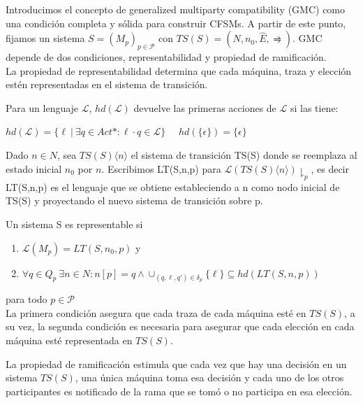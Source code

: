Introducimos el concepto de generalized multiparty compatibility (GMC) como una condición completa y sólida para construir CFSMs. 
A partir de este punto, fijamos un sistema $S =(M_p)_{p \in \mathcal{P}} $ con $TS(S)= (N, n_0, \hat{E}, \rightrightharpoons)$. GMC depende de dos condiciones, representabilidad y propiedad de ramificación.\\

La propiedad de representabilidad determina que cada máquina, traza y elección estén representadas en el sistema de transición.

\begin{definition}
Para un lenguaje $\mathcal{L}$, $hd(\mathcal{L})$ devuelve las primeras acciones de $\mathcal{L}$ si las tiene: 
\begin{center}
$hd(\mathcal{L})= \{\ell \ | \ \exists q \in Act*: \ell \cdot q \in \mathcal{L} \}$	\ \	 $hd(\{ \epsilon \}) = \{ \epsilon \}$
\end{center}
Dado $n \in N$, sea $ TS(S)\langle n \rangle$ el sistema de transición TS(S) donde se reemplaza al estado inicial $n_0$ por $n$. Escribimos LT(S,n,p) para $\mathcal{L}(TS(S)\langle n \rangle)\downharpoonright_p $, es decir LT(S,n,p) es el lenguaje que se obtiene estableciendo a n como nodo inicial de TS(S) y proyectando el nuevo sistema de transición sobre p.
\end{definition}

\begin{definition}[Representabilidad]
\label{def:representabilidad}
Un sistema S es representable si
\begin{enumerate}
\item $\mathcal{L}(M_p) = LT(S,n_0,p) $ y
\item $\forall q \in Q_p \ \exists n \in N: n[p] = q \land  \cup_{(q,\ell, q') \in \delta_p} \{ \ell \} \subseteq hd (LT(S,n,p))$
\end{enumerate}
para todo $p \in \mathcal{P} $ \\

La primera condición asegura que cada traza de cada máquina esté en $TS(S)$, a su vez, la segunda condición es necesaria para asegurar que cada elección en cada máquina esté representada en $TS(S)$.
\end{definition}

La propiedad de ramificación estimula que cada vez que hay una decisión en un sistema $TS(S)$, una única máquina toma esa decisión y cada uno de los otros participantes es notificado de la rama que se tomó o no participa en esa elección. 
 
